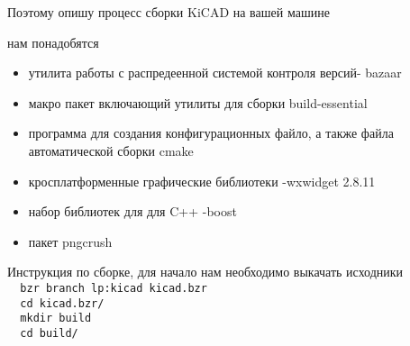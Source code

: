 Поэтому опишу процесс сборки KiCAD на вашей машине

нам понадобятся
\begin{itemize}
\item утилита работы с распредеенной системой контроля версий- bazaar
\item макро пакет включающий утилиты для сборки build-essential
\item программа для создания конфигурационных файло, а также файла автоматической сборки cmake
\item кросплатформенные графические библиотеки -wxwidget 2.8.11
\item набор библиотек для  для C++ -boost
\item пакет pngcrush
\end{itemize}

Инструкция по сборке, для начало нам необходимо выкачать исходники\\
\texttt{~ bzr branch lp:kicad kicad.bzr}\\
\texttt{~ cd kicad.bzr/}\\
\texttt{~ mkdir build}\\
\texttt{~ cd build/}\\

